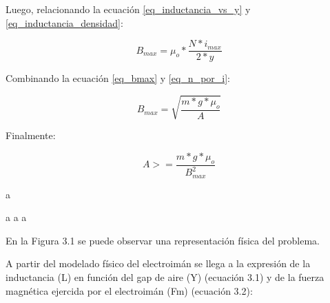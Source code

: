 Luego, relacionando la ecuación \ref{eq_inductancia_vs_y} y \ref{eq_inductancia_densidad}:

\begin{equation} \label{eq_bmax}
	B_{max}=\mu_{o}*\frac{N*i_{max}}{2*y}
\end{equation}

Combinando la ecuación \ref{eq_bmax} y \ref{eq_n_por_i}:

\begin{equation}
	B_{max}=\sqrt{\frac{m*g*\mu_{o}}{A}}
\end{equation}

Finalmente:

\begin{equation} \label{eq_area}
	A>=\frac{m*g*\mu_{o}}{B_{max}^{2}}
\end{equation}

a

a
a
a


En la Figura 3.1 se puede observar una representación física del problema.


A partir del modelado físico del electroimán se llega a la expresión de la inductancia (L) en función del gap de aire (Y) (ecuación 3.1) y de la fuerza magnética ejercida por el electroimán (Fm) (ecuación 3.2):



